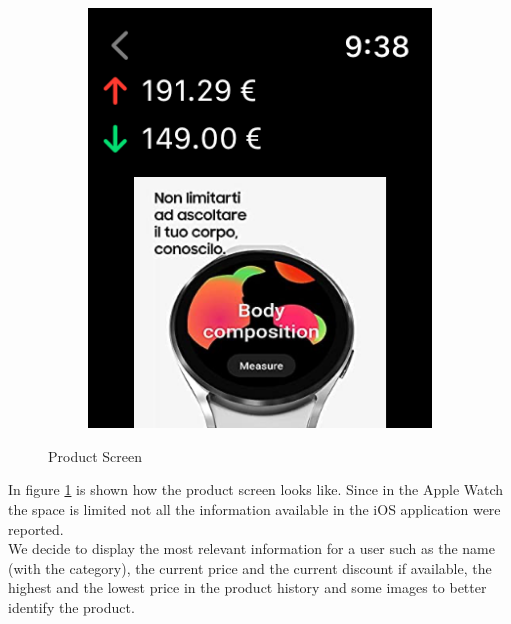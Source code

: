 \begin{figure}[h!]
\begin{subfigure}[b]{0.3\textwidth}
            \includegraphics[width=\textwidth]{images/interfaces/watch_product_2.png}
        \end{subfigure}
        
         \caption{Product Screen}
        \label{fig:watch_product_screen}
\end{figure}
\FloatBarrier
In figure \ref{fig:watch_product_screen} is shown how the product screen looks like. Since in the Apple Watch the space is limited not all the information available in the iOS application were reported.\\
We decide to display the most relevant information for a user such as the name (with the category), the current price and the current discount if available, the highest and the lowest price in the product history and some images to better identify the product.